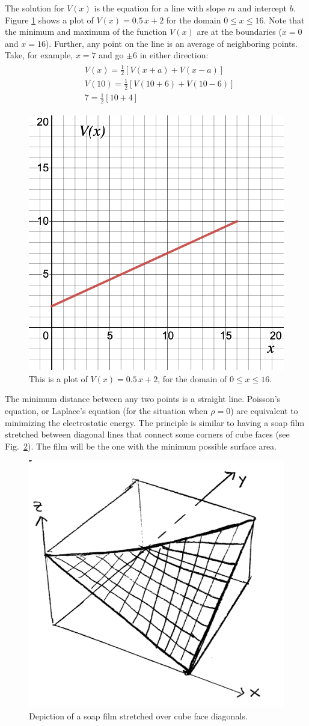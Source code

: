 \documentclass[12pt]{article}
\begin{document}
\begin{flushleft}
The solution for $V(x)$ is the equation for a line with slope $m$ and intercept $b$.  Figure \ref{fig:line} shows a plot of $V(x)= 0.5\,x+2$ for the domain $0 \leq x \leq 16$.  Note that the minimum and maximum of the function $V(x)$ are at the boundaries ($x=0$ and $x=16$).  Further, any point on the line is an average of neighboring points.  Take, for example, $x=7$ and go $\pm 6$ in either direction:
\begin{eqnarray*}
\begin{aligned}
& V(x) = \frac{1}{2}\left[ V(x+a) + V(x-a) \right] \\
& V(10) = \frac{1}{2}\left[ V(10+6) + V(10-6) \right] \\
& 7 = \frac{1}{2}\left[ 10 + 4 \right]
\end{aligned}
\end{eqnarray*}

\begin{figure}[h]
\centering
\includegraphics*[trim=0cm 0cm 0cm 0cm, clip=true, width=0.3\columnwidth]{line.png}
\caption{\small This is a plot of $V(x)=0.5 \,x+2$, for the domain of $0 \leq x \leq 16$.}
\label{fig:line}
\end{figure}

The minimum distance between any two points is a straight line.  Poisson's equation, or Laplace's equation (for the situation when $\rho=0$) are equivalent to minimizing the electrostatic energy.  
The principle is similar to having a soap film stretched between diagonal lines that connect some corners of cube faces (see Fig.~\ref{fig:soapfilm}).  The film will be the one with the minimum possible surface area. 

\begin{figure}[h]
\centering
\includegraphics*[trim=0cm 0cm 0cm 0cm, clip=true, width=0.4\columnwidth]{soap_film.png}
\caption{\small Depiction of a soap film stretched over cube face diagonals.}
\label{fig:soapfilm}
\end{figure}
 

\end{flushleft}
\end{document}
